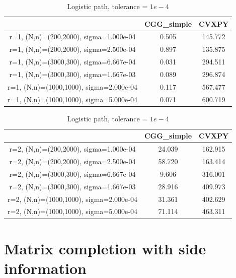 \documentclass[english]{article}
\begin{document}
\begin{table}[H]
	\centering
	\label{Table_logistic_path}
	\begin{tabular}{ccc}
		\toprule
		{} &  CGG\_simple &   CVXPY \\
		\midrule
		r=1, (N,n)=(200,2000), sigma=1.000e-04  &       0.505 & 145.772 \\
		r=1, (N,n)=(200,2000), sigma=2.500e-04  &       0.897 & 135.875 \\
		r=1, (N,n)=(3000,300), sigma=6.667e-04  &       0.031 & 294.511 \\
		r=1, (N,n)=(3000,300), sigma=1.667e-03  &       0.089 & 296.874 \\
		r=1, (N,n)=(1000,1000), sigma=2.000e-04 &       0.117 & 567.477 \\
		r=1, (N,n)=(1000,1000), sigma=5.000e-04 &       0.071 & 600.719 \\
		\bottomrule
	\end{tabular}
	\caption{Logistic path, tolerance = $1e-4$}
\end{table}



\begin{table}[H]
	\centering
	\label{Table_logistic_path}
	\begin{tabular}{ccc}
		\toprule
		{} &  CGG\_simple &   CVXPY \\
		\midrule
		r=2, (N,n)=(200,2000), sigma=1.000e-04  &      24.039 & 162.915 \\
		r=2, (N,n)=(200,2000), sigma=2.500e-04  &      58.720 & 163.414 \\
		r=2, (N,n)=(3000,300), sigma=6.667e-04  &       9.606 & 316.001 \\
		r=2, (N,n)=(3000,300), sigma=1.667e-03  &      28.916 & 409.973 \\
		r=2, (N,n)=(1000,1000), sigma=2.000e-04 &      31.361 & 402.629 \\
		r=2, (N,n)=(1000,1000), sigma=5.000e-04 &      71.114 & 463.311 \\
		\bottomrule
	\end{tabular}
	\caption{Logistic path, tolerance = $1e-4$}
\end{table}


\section{Matrix completion with side information}
\end{document}
